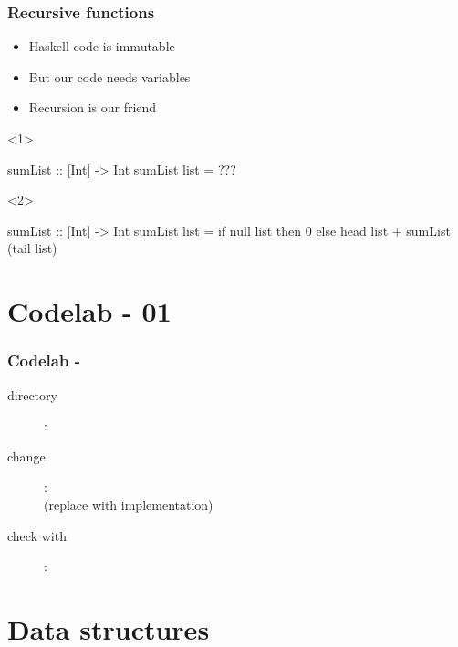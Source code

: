 \documentclass[17pt]{beamer}
\renewcommand{\(}[1]{\begin{columns}[#1]}
\renewcommand{\)}{\end{columns}}
\newcommand{\<}[1]{\begin{column}{#1}}
\renewcommand{\>}{\end{column}}
\begin{document}
\begin{frame}[fragile]
  \frametitle{Recursive functions}
  \begin{minipage}[t][.2\textheight]{\textwidth}
    \begin{itemize}
      \item<1-> Haskell code is immutable
      \item<1-> But our code needs variables
      \item<2-> Recursion is our friend
    \end{itemize}
  \end{minipage}
  \begin{minipage}[c][.5\textheight]{\textwidth}
  \begin{center}
    \begin{onlyenv}<1>
      \begin{code}
sumList :: [Int] -> Int
sumList list = ???
      \end{code}
    \end{onlyenv}
    \begin{onlyenv}<2>
      \begin{code}
sumList :: [Int] -> Int
sumList list =
  if null list
  then 0
  else head list + sumList (tail list)
      \end{code}
    \end{onlyenv}
  \end{center}
  \end{minipage}
\end{frame}


\section{Codelab - 01}

\begin{frame}
  \frametitle{Codelab - }
  \begin{description}
    \item[directory]: 
    \item[change]:  \\
      (replace  with implementation)
    \item[check with]: 
  \end{description}
\end{frame}


\section{Data structures}
\end{document}

